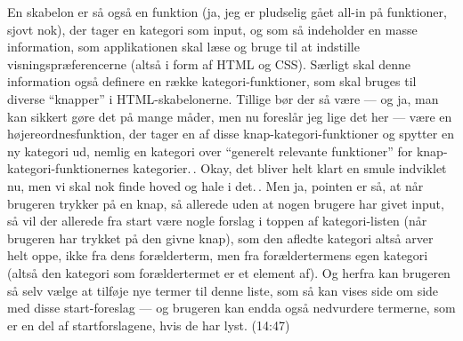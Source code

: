 \documentclass{report}
\begin{document}
En skabelon er så også en funktion (ja, jeg er pludselig gået all-in på funktioner, sjovt nok), der tager en kategori som input, og som så indeholder en masse information, som applikationen skal læse og bruge til at indstille visningspræferencerne (altså i form af HTML og CSS). Særligt skal denne information også definere en række kategori-funktioner, som skal bruges til diverse ``knapper'' i HTML-skabelonerne. Tillige bør der så være --- og ja, man kan sikkert gøre det på mange måder, men nu foreslår jeg lige det her --- være en højereordnesfunktion, der tager en af disse knap-kategori-funktioner og spytter en ny kategori ud, nemlig en kategori over ``generelt relevante funktioner'' for knap-kategori-funktionernes kategorier.\,. Okay, det bliver helt klart en smule indviklet nu, men vi skal nok finde hoved og hale i det.\,. Men ja, pointen er så, at når brugeren trykker på en knap, så allerede uden at nogen brugere har givet input, så vil der allerede fra start være nogle forslag i toppen af kategori-listen (når brugeren har trykket på den givne knap), som den afledte kategori altså arver helt oppe, ikke fra dens forælderterm, men fra forældertermens egen kategori (altså den kategori som forældertermet er et element af). Og herfra kan brugeren så selv vælge at tilføje nye termer til denne liste, som så kan vises side om side med disse start-foreslag --- og brugeren kan endda også nedvurdere termerne, som er en del af startforslagene, hvis de har lyst. (14:47)
\end{document}
